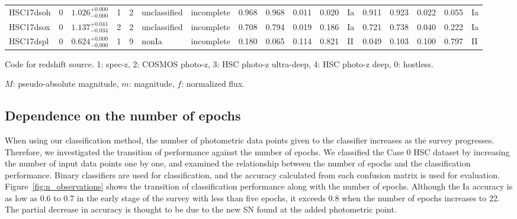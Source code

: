 \documentclass[useamsfonts]{pasj01}
\begin{document}
\begin{table}[htbp]
{\begin{tabular}{p{4em}p{1em}p{4.0em}p{2.1em}|p{0.6em}p{4.0em}p{4.5em}|p{2.9em}|p{1.2em}p{1.2em}p{1.2em}p{0.6em}|p{2.9em}|p{1.2em}p{1.2em}p{1.2em}p{0.6em}}
HSC17dsoh &     0 &    $1.026_{-0.000}^{+0.000}$ &         1 &    2 &  unclassified &   incomplete &    0.968 &    0.968 &    0.011 &    0.020 &      Ia &    0.911 &    0.923 &    0.022 &    0.055 &      Ia \\
HSC17dsox &     0 &    $1.137_{-0.034}^{+0.041}$ &         2 &    2 &  unclassified &   incomplete &    0.708 &    0.794 &    0.019 &    0.186 &      Ia &    0.721 &    0.738 &    0.040 &    0.222 &      Ia \\
HSC17dspl &     0 &    $0.624_{-0.000}^{+0.000}$ &         1 &    9 &  nonIa &   incomplete &    0.180 &    0.065 &    0.114 &    0.821 &      II &    0.049 &    0.103 &    0.100 &    0.797 &      II \\
\hline
\end{tabular}
}\label{tab:h_results}
\begin{tabnote}
\footnotemark[$*$] Code for redshift source.
1: spec-z, 2: COSMOS photo-z, 3: HSC photo-z ultra-deep, 4: HSC photo-z deep, 0: hostless.

\footnotemark[$\dagger$] $M$: pseudo-absolute magnitude, $m$: magnitude, $f$: normalized flux.
\end{tabnote}
\end{table}
%
%
\subsection{Dependence on the number of epochs}
%
When using our classification method, the number of photometric data points given to the classifier increases as the survey progresses.
Therefore, we investigated the transition of performance against the number of epochs.
We classified the Case 0 HSC dataset by increasing the number of input data points one by one, and examined the relationship between the number of epochs and the classification performance.
Binary classifiers are used for classification, and the accuracy calculated from each confusion matrix is used for evaluation.
Figure\ \ref{fig:n_observations} shows the transition of classification performance along with the number of epochs.
Although the Ia accuracy is as low as 0.6 to 0.7 in the early stage of the survey with less than five epochs, it exceeds 0.8 when the number of epochs increases to 22.
The partial decrease in accuracy is thought to be due to the new SN found at the added photometric point.
\end{document}
